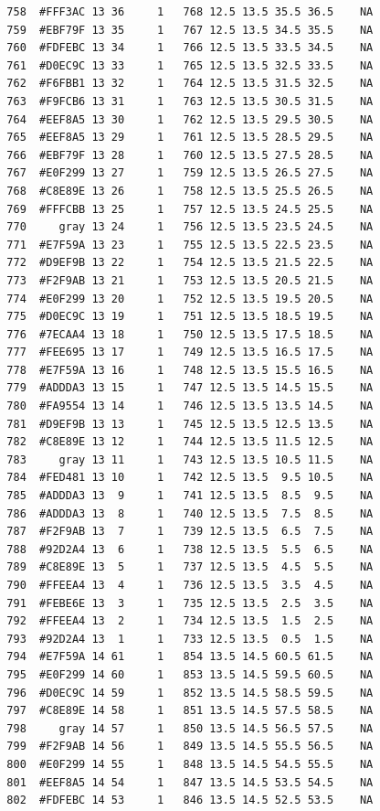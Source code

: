 \documentclass[12pt,twoside]{reedthesis}
\begin{document}
\begin{verbatim}
  758  #FFF3AC 13 36     1   768 12.5 13.5 35.5 36.5    NA
  759  #EBF79F 13 35     1   767 12.5 13.5 34.5 35.5    NA
  760  #FDFEBC 13 34     1   766 12.5 13.5 33.5 34.5    NA
  761  #D0EC9C 13 33     1   765 12.5 13.5 32.5 33.5    NA
  762  #F6FBB1 13 32     1   764 12.5 13.5 31.5 32.5    NA
  763  #F9FCB6 13 31     1   763 12.5 13.5 30.5 31.5    NA
  764  #EEF8A5 13 30     1   762 12.5 13.5 29.5 30.5    NA
  765  #EEF8A5 13 29     1   761 12.5 13.5 28.5 29.5    NA
  766  #EBF79F 13 28     1   760 12.5 13.5 27.5 28.5    NA
  767  #E0F299 13 27     1   759 12.5 13.5 26.5 27.5    NA
  768  #C8E89E 13 26     1   758 12.5 13.5 25.5 26.5    NA
  769  #FFFCBB 13 25     1   757 12.5 13.5 24.5 25.5    NA
  770     gray 13 24     1   756 12.5 13.5 23.5 24.5    NA
  771  #E7F59A 13 23     1   755 12.5 13.5 22.5 23.5    NA
  772  #D9EF9B 13 22     1   754 12.5 13.5 21.5 22.5    NA
  773  #F2F9AB 13 21     1   753 12.5 13.5 20.5 21.5    NA
  774  #E0F299 13 20     1   752 12.5 13.5 19.5 20.5    NA
  775  #D0EC9C 13 19     1   751 12.5 13.5 18.5 19.5    NA
  776  #7ECAA4 13 18     1   750 12.5 13.5 17.5 18.5    NA
  777  #FEE695 13 17     1   749 12.5 13.5 16.5 17.5    NA
  778  #E7F59A 13 16     1   748 12.5 13.5 15.5 16.5    NA
  779  #ADDDA3 13 15     1   747 12.5 13.5 14.5 15.5    NA
  780  #FA9554 13 14     1   746 12.5 13.5 13.5 14.5    NA
  781  #D9EF9B 13 13     1   745 12.5 13.5 12.5 13.5    NA
  782  #C8E89E 13 12     1   744 12.5 13.5 11.5 12.5    NA
  783     gray 13 11     1   743 12.5 13.5 10.5 11.5    NA
  784  #FED481 13 10     1   742 12.5 13.5  9.5 10.5    NA
  785  #ADDDA3 13  9     1   741 12.5 13.5  8.5  9.5    NA
  786  #ADDDA3 13  8     1   740 12.5 13.5  7.5  8.5    NA
  787  #F2F9AB 13  7     1   739 12.5 13.5  6.5  7.5    NA
  788  #92D2A4 13  6     1   738 12.5 13.5  5.5  6.5    NA
  789  #C8E89E 13  5     1   737 12.5 13.5  4.5  5.5    NA
  790  #FFEEA4 13  4     1   736 12.5 13.5  3.5  4.5    NA
  791  #FEBE6E 13  3     1   735 12.5 13.5  2.5  3.5    NA
  792  #FFEEA4 13  2     1   734 12.5 13.5  1.5  2.5    NA
  793  #92D2A4 13  1     1   733 12.5 13.5  0.5  1.5    NA
  794  #E7F59A 14 61     1   854 13.5 14.5 60.5 61.5    NA
  795  #E0F299 14 60     1   853 13.5 14.5 59.5 60.5    NA
  796  #D0EC9C 14 59     1   852 13.5 14.5 58.5 59.5    NA
  797  #C8E89E 14 58     1   851 13.5 14.5 57.5 58.5    NA
  798     gray 14 57     1   850 13.5 14.5 56.5 57.5    NA
  799  #F2F9AB 14 56     1   849 13.5 14.5 55.5 56.5    NA
  800  #E0F299 14 55     1   848 13.5 14.5 54.5 55.5    NA
  801  #EEF8A5 14 54     1   847 13.5 14.5 53.5 54.5    NA
  802  #FDFEBC 14 53     1   846 13.5 14.5 52.5 53.5    NA

\end{verbatim}
\end{document}
